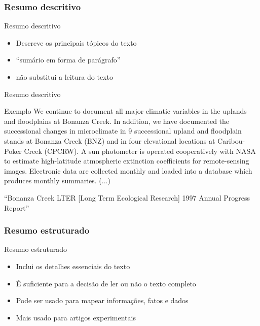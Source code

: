\documentclass{beamer}
\begin{document}
\subsubsection[Descritivo]{Resumo descritivo}

\begin{frame}{Resumo descritivo}
  \begin{itemize}
  \item Descreve os principais tópicos do texto
  \item ``sumário em forma de parágrafo''
  \item não substitui a leitura do texto
  \end{itemize}
\end{frame}

\begin{frame}{Resumo descritivo}
  \begin{exampleblock}{Exemplo}
    \scriptsize
    We continue to document all major climatic variables in the
    uplands and floodplains at Bonanza Creek. In addition, we have
    documented the successional changes in microclimate in 9
    successional upland and floodplain stands at Bonanza Creek (BNZ)
    and in four elevational locations at Caribou-Poker Creek
    (CPCRW). A sun photometer is operated cooperatively with NASA to
    estimate high-latitude atmospheric extinction coefficients for
    remote-sensing images. Electronic data are collected monthly and
    loaded into a database which produces monthly summaries.  (...)
  \end{exampleblock}

  \vfill
  \tiny
  \hfill ``Bonanza Creek LTER [Long Term Ecological Research] 1997 Annual
  Progress Report''
\end{frame}

\subsubsection[Estruturado]{Resumo estruturado}

\begin{frame}{Resumo estruturado}
  \begin{itemize}
  \item Inclui os detalhes essenciais do texto
  \item É suficiente para a decisão de ler ou não o texto completo
  \item Pode ser usado para mapear informações, fatos e dados
  \item Mais usado para artigos experimentais
  \end{itemize}
\end{frame}
\end{document}
